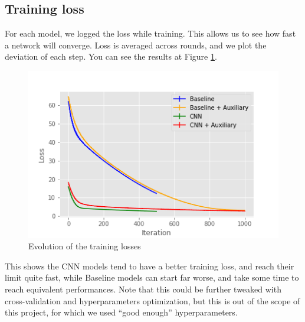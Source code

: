 \documentclass[10pt,conference]{IEEEtran}
\begin{document}
\subsection{Training loss}
For each model, we logged the loss while training. This allows us to see how fast a network will converge. Loss is averaged across rounds, and we plot the deviation of each step. You can see the results at Figure \ref{fig:training_losses}.
\begin{figure}
    \centering
    \includegraphics[scale=0.6]{../images/rounds_losses}
    \caption{Evolution of the training losses}
    \label{fig:training_losses}
\end{figure}
This shows the CNN models tend to have a better training loss, and reach their limit quite fast, while Baseline models can start far worse, and take some time to reach equivalent performances. Note that this could be further tweaked with cross-validation and hyperparameters optimization, but this is out of the scope of this project, for which we used ``good enough'' hyperparameters.
\end{document}
